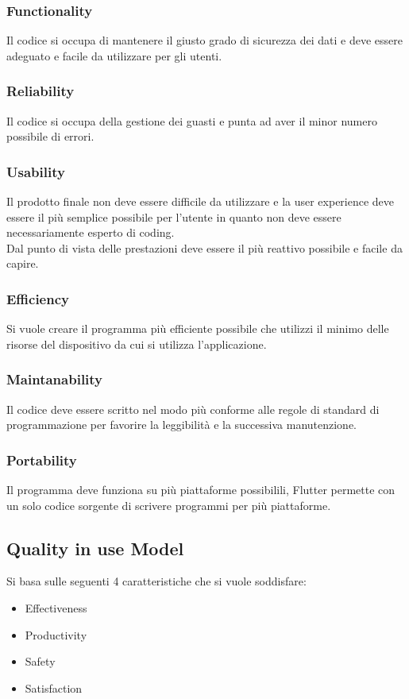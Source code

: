 \documentclass{article}
\begin{document}
\subsubsection{Functionality}
Il codice si occupa di mantenere il giusto grado di sicurezza dei dati e deve essere adeguato e facile
da utilizzare per gli utenti.

\subsubsection{Reliability}
Il codice si occupa della gestione dei guasti e punta ad aver il minor numero possibile di errori.

\subsubsection{Usability}
Il prodotto finale non deve essere difficile da utilizzare e la user experience deve essere il più
semplice possibile per l'utente in quanto non deve essere necessariamente esperto di coding.
\\Dal punto di vista delle prestazioni deve essere il più reattivo possibile e facile da capire.

\subsubsection{Efficiency}
Si vuole creare il programma più efficiente possibile che utilizzi il minimo delle risorse del dispositivo
da cui si utilizza l'applicazione.

\subsubsection{Maintanability}
Il codice deve essere scritto nel modo più conforme alle regole di standard di programmazione per favorire
la leggibilità e la successiva manutenzione.

\subsubsection{Portability}
Il programma deve funziona su più piattaforme possibilili, Flutter permette con un solo codice 
sorgente di scrivere programmi per più piattaforme.

\subsection{Quality in use Model}
Si basa sulle seguenti 4 caratteristiche che si vuole soddisfare:
\begin{itemize}
    \item Effectiveness
    \item Productivity
    \item Safety
    \item Satisfaction 
\end{itemize}
\end{document}
